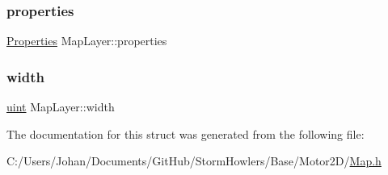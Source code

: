 \subsubsection{\texorpdfstring{properties}{properties}}
{\footnotesize\ttfamily \mbox{\hyperlink{struct_properties}{Properties}} Map\+Layer\+::properties}

\mbox{\label{struct_map_layer_a61b0c86af821d15041977da477280a75}} 
\subsubsection{\texorpdfstring{width}{width}}
{\footnotesize\ttfamily \mbox{\hyperlink{_defs_8h_a91ad9478d81a7aaf2593e8d9c3d06a14}{uint}} Map\+Layer\+::width}



The documentation for this struct was generated from the following file\+:\begin{DoxyCompactItemize}
\item 
C\+:/\+Users/\+Johan/\+Documents/\+Git\+Hub/\+Storm\+Howlers/\+Base/\+Motor2\+D/\mbox{\hyperlink{_map_8h}{Map.\+h}}\end{DoxyCompactItemize}
